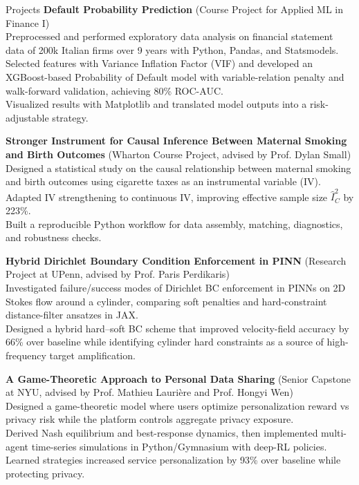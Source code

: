 \begin{rubric}{Projects}
%
	\textbf{Default Probability Prediction} (Course Project for Applied ML in Finance I)\\
	Preprocessed and performed exploratory data analysis on financial statement data of 200k Italian firms over 9 years with Python, Pandas, and Statsmodels.\\
	Selected features with Variance Inflation Factor (VIF) and developed an XGBoost-based Probability of Default model with variable-relation penalty and walk-forward validation, achieving 80\% ROC-AUC.\\
	Visualized results with Matplotlib and translated model outputs into a risk-adjustable strategy.

%
	\textbf{Stronger Instrument for Causal Inference Between Maternal Smoking and Birth Outcomes} (Wharton Course Project, advised by Prof. Dylan Small)\\
	Designed a statistical study on the causal relationship between maternal smoking and birth outcomes using cigarette taxes as an instrumental variable (IV).\\
	Adapted IV strengthening to continuous IV, improving effective sample size $\hat{I}_{C}^{2}$ by 223\%.\\
	Built a reproducible Python workflow for data assembly, matching, diagnostics, and robustness checks.

%
	\textbf{Hybrid Dirichlet Boundary Condition Enforcement in PINN} (Research Project at UPenn, advised by Prof. Paris Perdikaris)\\
	Investigated failure/success modes of Dirichlet BC enforcement in PINNs on 2D Stokes flow around a cylinder, comparing soft penalties and hard-constraint distance-filter ansatzes in JAX.\\
	Designed a hybrid hard--soft BC scheme that improved velocity-field accuracy by 66\% over baseline while identifying cylinder hard constraints as a source of high-frequency target amplification.

%
	\textbf{A Game-Theoretic Approach to Personal Data Sharing} (Senior Capstone at NYU, advised by Prof. Mathieu Lauri\`ere and Prof. Hongyi Wen)\\
	Designed a game-theoretic model where users optimize personalization reward vs privacy risk while the platform controls aggregate privacy exposure.\\
	Derived Nash equilibrium and best-response dynamics, then implemented multi-agent time-series simulations in Python/Gymnasium with deep-RL policies.\\
	Learned strategies increased service personalization by 93\% over baseline while protecting privacy.


\end{rubric}

